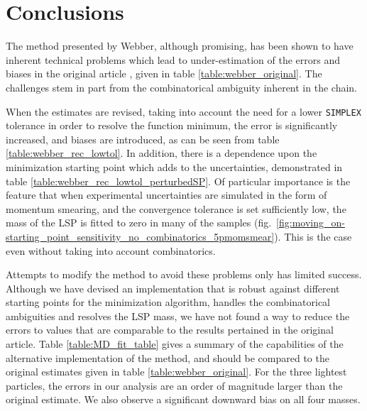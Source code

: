 \documentclass[twoside,english]{uiofysmaster}
\begin{document}












\chapter{Conclusions} %
The method presented by Webber, although promising, has been shown to have inherent technical problems which lead to under-estimation of the errors and biases in the original article \cite{Webber:2009vm}, given in table \ref{table:webber_original}. The challenges stem in part from the combinatorical ambiguity inherent in the chain. 

When the estimates are revised, taking into account the need for a lower {\tt SIMPLEX} tolerance in order to resolve the function minimum, the error is significantly increased, and biases are introduced, as can be seen from table \ref{table:webber_rec_lowtol}. In addition, there is a dependence upon the minimization starting point which adds to the uncertainties, demonstrated in table \ref{table:webber_rec_lowtol_perturbedSP}. Of particular importance is the feature that when experimental uncertainties are simulated in the form of momentum smearing, and the convergence tolerance is set sufficiently low, the mass of the LSP is fitted to zero in many of the samples (fig.\ \ref{fig:moving_on-starting_point_sensitivity_no_combinatorics_5pmomsmear}). This is the case even without taking into account combinatorics.

Attempts to modify the method to avoid these problems only has limited success. Although we have devised an implementation that is robust against different starting points for the minimization algorithm, handles the combinatorical ambiguities and resolves the LSP mass, we have not found a way to reduce the errors to values that are comparable to the results pertained in the original article. Table \ref{table:MD_fit_table} gives a summary of the capabilities of the alternative implementation of the method, and should be compared to the original estimates given in table \ref{table:webber_original}. For the three lightest particles, the errors in our analysis are an order of magnitude larger than the original estimate. We also observe a significant downward bias on all four masses.
\end{document}
